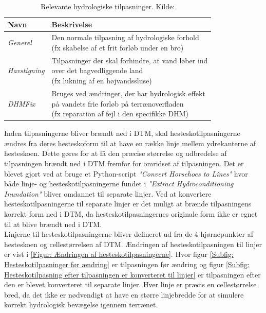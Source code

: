 \begin{table}[H]
\centering
\renewcommand{\arraystretch}{1.5}
\begin{threeparttable}
\caption{Relevante hydrologiske tilpasninger. Kilde: \cite{GeoDanmark_HydroLag}}
\label{Tabel: Relevante hydrologiske tilpasninger}
\begin{tabular}{@{} l l @{}} 
\toprule
\textbf{Navn} & \textbf{Beskrivelse} \\
\midrule
\textit{Generel} &
  \makecell[l]{Den normale tilpasning af hydrologiske forhold\\
  (fx skabelse af et frit forløb under en bro)} \\
\addlinespace
\textit{Havstigning} &
  \makecell[l]{Tilpasninger der skal forhindre, at vand løber ind\\
  over det bagvedliggende land\\
  (fx lukning af en højvandssluse)} \\
\addlinespace
\textit{DHMFix} &
  \makecell[l]{Bruges ved ændringer, der har hydrologisk effekt\\
  på vandets frie forløb på terrænoverfladen\\
  (fx reparation af fejl i den specifikke DHM)} \\
\bottomrule
\end{tabular}
\end{threeparttable}
\end{table}

Inden tilpasningerne bliver brændt ned i DTM, skal hesteskotilpasningerne ændres fra deres hesteskoform til at have en række linje mellem ydrekanterne af hesteskoen. Dette gøres for at få den præcise størrelse og udbredelse af tilpasningen brændt ned i DTM fremfor for omridset af tilpasningen. Det er blevet gjort ved at bruge et Python-script \textit{"Convert Horsehoes to Lines"} hvor både linje- og hesteskotilpasningerne fundet i \textit{"Extract Hydroconditioning Inundation"} bliver omdannet til separate linjer. Ved at konvertere hesteskotilpasningerne til separate linjer er det muligt at brænde tilpasningens korrekt form ned i DTM, da hesteskotilpasningernes originale form ikke er egnet til at blive brændt ned i DTM. \\
Linjerne til hesteskotilpasningerne bliver defineret ud fra de 4 hjørnepunkter af hesteskoen og cellestørrelsen af DTM. Ændringen af hesteskotilpasningen til linjer er vist i \ref{Figur: Ændringen af hesteskotilpasningerne}. Hvor figur \ref{Subfig: Hesteskotilpasninger før ændring} er tilpasningen før ændring og figur \ref{Subfig: Hesteskotilpasning efter tilpasningen er konverteret til linjer} er tilpasningen efter den er blevet konverteret til separate linjer. Hver linje er præcis en cellestørrelse bred, da det ikke er nødvendigt at have en større linjebredde for at simulere korrekt hydrologisk bevægelse igennem terrænet. 

